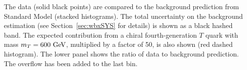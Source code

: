         The data (solid black points) are compared to the background 
        prediction from Standard Model (stacked histograms). 
        The total uncertainty on the background estimation (see 
        Section~\ref{sec:wbxSYS} for details) is shown as a black hashed band.
        The expected contribution from a chiral fourth-generation $T$ quark 
        with mass $m_{\T}=600\gev$, multiplied by a factor of 50, 
        is also shown (red dashed histogram).
        The lower panel shows the ratio of data to background prediction. 
        The overflow has been added to the last bin.
